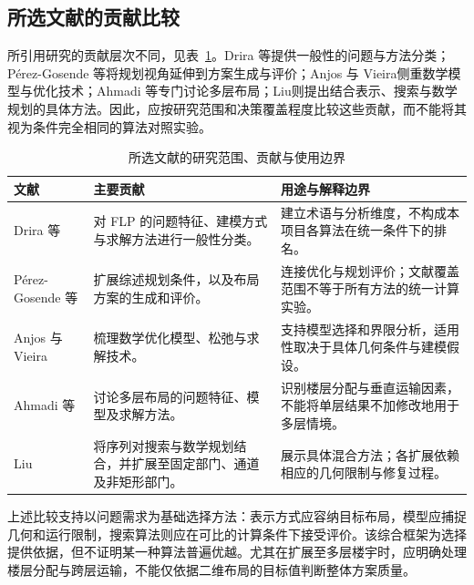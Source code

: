\documentclass[UTF8,zihao=5,a4paper,fontset=fandol]{ctexart}
\begin{document}
\subsection{所选文献的贡献比较}
所引用研究的贡献层次不同，见表~\ref{tab:review-comparison}。Drira 等\cite{drira2007}提供一般性的问题与方法分类；P\'{e}rez-Gosende 等\cite{perez2021}将规划视角延伸到方案生成与评价；Anjos 与 Vieira\cite{anjos2017}侧重数学模型与优化技术；Ahmadi 等\cite{ahmadi2017}专门讨论多层布局；Liu\cite{liu2004}则提出结合表示、搜索与数学规划的具体方法。因此，应按研究范围和决策覆盖程度比较这些贡献，而不能将其视为条件完全相同的算法对照实验。

\begin{table}[htbp]
\centering
\caption{所选文献的研究范围、贡献与使用边界}
\label{tab:review-comparison}
\small
\renewcommand{\arraystretch}{1.22}
\begin{tabularx}{\textwidth}{@{}p{} >{\raggedright\arraybackslash}X >{\raggedright\arraybackslash}X@{}}
\toprule
\textbf{文献} & \textbf{主要贡献} & \textbf{用途与解释边界} \\
\midrule
Drira 等\cite{drira2007}
& 对 FLP 的问题特征、建模方式与求解方法进行一般性分类。
& 建立术语与分析维度，不构成本项目各算法在统一条件下的排名。 \\
\addlinespace
P\'{e}rez-Gosende 等\cite{perez2021}
& 扩展综述规划条件，以及布局方案的生成和评价。
& 连接优化与规划评价；文献覆盖范围不等于所有方法的统一计算实验。 \\
\addlinespace
Anjos 与 Vieira\cite{anjos2017}
& 梳理数学优化模型、松弛与求解技术。
& 支持模型选择和界限分析，适用性取决于具体几何条件与建模假设。 \\
\addlinespace
Ahmadi 等\cite{ahmadi2017}
& 讨论多层布局的问题特征、模型及求解方法。
& 识别楼层分配与垂直运输因素，不能将单层结果不加修改地用于多层情境。 \\
\addlinespace
Liu\cite{liu2004}
& 将序列对搜索与数学规划结合，并扩展至固定部门、通道及非矩形部门。
& 展示具体混合方法；各扩展依赖相应的几何限制与修复过程。 \\
\bottomrule
\end{tabularx}
\end{table}

上述比较支持以问题需求为基础选择方法：表示方式应容纳目标布局，模型应捕捉几何和运行限制，搜索算法则应在可比的计算条件下接受评价。该综合框架为选择提供依据，但不证明某一种算法普遍优越。尤其在扩展至多层楼宇时，应明确处理楼层分配与跨层运输，不能仅依据二维布局的目标值判断整体方案质量。
\end{document}

